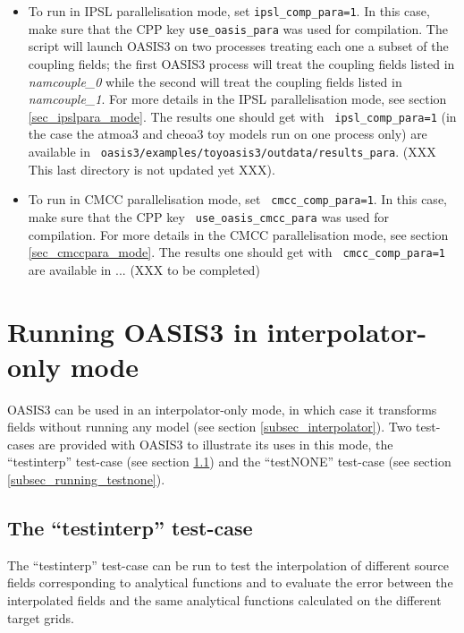 \begin{itemize}
\item To run in IPSL parallelisation mode, set {\tt ipsl\_comp\_para=1}. In this case,
make sure that the CPP key {\tt use\_oasis\_para} was used for
compilation. The script will launch OASIS3 on two processes treating
each one a subset of the coupling fields; the first OASIS3 process
will treat the coupling fields listed in {\it namcouple\_0} while the
second will treat the coupling fields listed in {\it namcouple\_1}.
For more details in the IPSL parallelisation mode, see section
\ref{sec_ipslpara_mode}.  The results one should get with {\tt
  ipsl\_comp\_para=1} (in the case the atmoa3 and cheoa3 toy models run on
one process only) are available in {\tt
  oasis3/examples/toyoasis3/outdata/results\_para}. (XXX This last directory is not updated yet XXX).

\item To run in CMCC parallelisation mode, set {\tt
    cmcc\_comp\_para=1}. In this case, make sure that the CPP key {\tt
    use\_oasis\_cmcc\_para} was used for compilation.  For more
  details in the CMCC parallelisation mode, see section
  \ref{sec_cmccpara_mode}. The results one should get with {\tt
    cmcc\_comp\_para=1} are available in ... (XXX to be completed)

\end{itemize}

\section{Running OASIS3 in interpolator-only mode}

OASIS3 can be used in an interpolator-only mode, in which case it
transforms fields without running any model (see section
\ref{subsec_interpolator}). Two test-cases are provided with OASIS3 to
illustrate its uses in this mode, the ``testinterp'' test-case (see
section \ref{subsec_running_testinterp}) and the ``testNONE''
test-case (see section \ref{subsec_running_testnone}). 

\subsection{The ``testinterp'' test-case}
\label{subsec_running_testinterp}

The ``testinterp'' test-case can be run to test the interpolation of
different source fields corresponding to analytical functions 
and to evaluate the error between the
interpolated fields and the same analytical functions calculated on the
different target grids.

